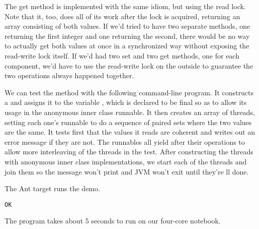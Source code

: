 The get method is implemented with the same idiom, but using the
read lock.
%
%
Note that it, too, does all of its work after the lock is acquired,
returning an array consisting of both values.  If we'd tried to have
two separate methods, one returning the first integer and one
returning the second, there would be no way to actually get both
values at once in a synchronized way without exposing the read-write
lock itself.  If we'd had two set and two get methods, one for each
component, we'd have to use the read-write lock on the outside to
guarantee the two operations always happened together.  

We can test the method with the following command-line program.
%
%
It constructs a  and assigns it to the variable
, which is declared to be final so as to allow its usage in
the anonymous inner class runnable.  It then creates an array of threads,
setting each one's runnable to do a sequence of paired sets where the
two values are the same.  It tests first that the values it reads are
coherent and writes out an error message if they are not.  The runnables
all yield after their operations to allow more interleaving of the threads
in the test.  After constructing the threads with anonymous inner class
 implementations, we start each of the threads and join them
so the message won't print and JVM won't exit until they're ll done.

The Ant target  runs the demo.  
%
\begin{verbatim}
OK
\end{verbatim}
%
The program takes about 5 seconds to run on our four-core notebook.


